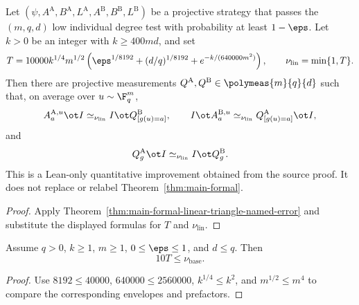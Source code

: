 \begin{theorem}
\label{thm:main-formal-linear-triangle}
	\leanok
	Let $(\psi,A^{\mathrm A},B^{\mathrm A},L^{\mathrm A},
	A^{\mathrm B},B^{\mathrm B},L^{\mathrm B})$ be a projective strategy that
	passes the $(m,q,d)$ low individual degree test with probability at least
	$1-\eps$.  Let $k>0$ be an integer with $k\ge 400md$, and set
	\[
		T=10000 k^{1/4}m^{1/2}\left(
			\eps^{1/8192}+(d/q)^{1/8192}
			+e^{-k/(640000m^2)}\right),
		\qquad \nu_{\mathrm{lin}}=\min\{1,T\}.
	\]
	Then there are projective measurements
	$Q^{\mathrm A},Q^{\mathrm B}\in\polymeas{m}{q}{d}$ such that, on average
	over $u\sim\F_q^m$,
	\[
		A_a^{\mathrm A,u}\ot I\simeq_{\nu_{\mathrm{lin}}}
			I\ot Q^{\mathrm B}_{[g(u)=a]},
		\qquad
		I\ot A_a^{\mathrm B,u}\simeq_{\nu_{\mathrm{lin}}}
			Q^{\mathrm A}_{[g(u)=a]}\ot I,
	\]
	and
	\[
		Q_g^{\mathrm A}\ot I\simeq_{\nu_{\mathrm{lin}}}
			I\ot Q_g^{\mathrm B}.
	\]
	This is a Lean-only quantitative improvement obtained from the source proof.
	It does not replace or relabel Theorem~\ref{thm:main-formal}.
\end{theorem}
\begin{proof}
	\leanok
	Apply Theorem~\ref{thm:main-formal-linear-triangle-named-error} and substitute
	the displayed formulas for $T$ and $\nu_{\mathrm{lin}}$.
\end{proof}

\begin{lemma}
\label{lem:main-formal-linear-triangle-factor-ten}
	\leanok
	Assume $q>0$, $k\ge1$, $m\ge1$, $0\le\eps\le1$, and $d\le q$.  Then
	\[
		10T\le \nu_{\mathrm{base}}.
	\]
\end{lemma}
\begin{proof}
	\leanok
	Use $8192\le40000$, $640000\le2560000$,
	$k^{1/4}\le k^2$, and $m^{1/2}\le m^4$ to compare the corresponding
	envelopes and prefactors.
\end{proof}

